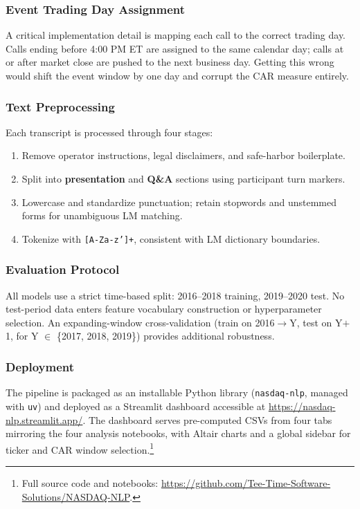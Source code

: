 \documentclass[conference]{IEEEtran}
\begin{document}
\subsubsection{Event Trading Day Assignment}

A critical implementation detail is mapping each call to the correct trading day.
Calls ending before 4:00 PM ET are assigned to the same calendar day; calls
at or after market close are pushed to the next business day. Getting this wrong
would shift the event window by one day and corrupt the CAR measure entirely.

\subsubsection{Text Preprocessing}

Each transcript is processed through four stages:
\begin{enumerate}
  \item Remove operator instructions, legal disclaimers, and safe-harbor boilerplate.
  \item Split into \textbf{presentation} and \textbf{Q\&A} sections using
        participant turn markers.
  \item Lowercase and standardize punctuation; retain stopwords and unstemmed
        forms for unambiguous LM matching.
  \item Tokenize with \texttt{[A-Za-z']+}, consistent with LM dictionary boundaries.
\end{enumerate}

\subsubsection{Evaluation Protocol}

All models use a strict time-based split: 2016--2018 training, 2019--2020 test.
No test-period data enters feature vocabulary construction or hyperparameter
selection. An expanding-window cross-validation (train on 2016$\rightarrow$Y,
test on Y$+$1, for Y $\in$ \{2017, 2018, 2019\}) provides additional robustness.

\subsubsection{Deployment}

The pipeline is packaged as an installable Python library (\texttt{nasdaq-nlp},
managed with \texttt{uv}) and deployed as a Streamlit dashboard accessible
at \url{https://nasdaq-nlp.streamlit.app/}.
The dashboard serves pre-computed CSVs from four tabs mirroring the four
analysis notebooks, with Altair charts and a global sidebar for ticker and
CAR window selection.\footnote{Full source code and notebooks:
\url{https://github.com/Tee-Time-Software-Solutions/NASDAQ-NLP}.}
\end{document}
